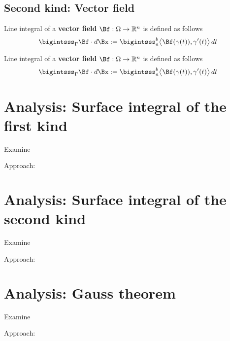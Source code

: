 \documentclass[12pt]{article}
\begin{document}
\subsection{Second kind: Vector field}
\begin{recallboxed}
	\label{recall:vectorsurface}
	Line integral of a \textbf{vector field} $\Bf: \Omega \to \mathbb{R}^{n}$ is defined as follows
	\begin{align}
		\bigintsss_{\Gamma} \Bf \cdot d\Bx 
		:= \bigintsss_{a}^{b} \big\langle \Bf(\gamma(t)), \gamma'(t) \big\rangle \, dt
	\end{align}
\end{recallboxed}
\begin{recallboxed}
	\label{recall:vector}
	Line integral of a \textbf{vector field} $\Bf: \Omega \to \mathbb{R}^{n}$ is defined as follows
	\begin{align}
		\bigintsss_{\Gamma} \Bf \cdot d\Bx 
		:= \bigintsss_{a}^{b} \big\langle \Bf(\gamma(t)), \gamma'(t) \big\rangle \, dt
	\end{align}
\end{recallboxed}
\clearpage
\section{Analysis: Surface integral of the first kind}
\begin{exampleboxed}
	Examine
\end{exampleboxed}
Approach:

\clearpage
\section{Analysis: Surface integral of the second kind}
\begin{exampleboxed}
	Examine
\end{exampleboxed}
Approach:

\clearpage
\section{Analysis: Gauss theorem}
\begin{exampleboxed}
	Examine
\end{exampleboxed}
Approach:


% 
\end{document}
